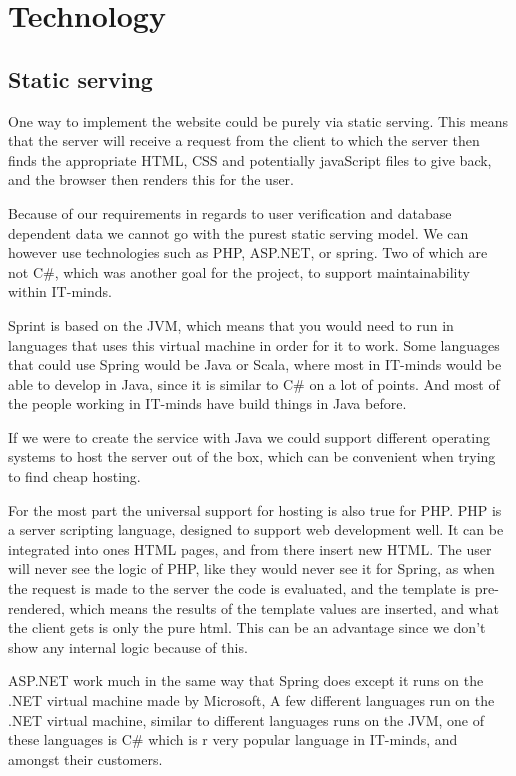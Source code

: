 \chapter{Technology}
\label{chap:Technology}

\section{Static serving}
\label{sec:Static serving}
One way to implement the website could be purely via static serving. This means that the server will receive a request from the client to which the server then finds the appropriate HTML, CSS and potentially javaScript files to give back, and the browser then renders this for the user.

Because of our requirements in regards to user verification and database dependent data we cannot go with the purest static serving model. We can however use technologies such as PHP, ASP.NET, or spring. Two of which are not C\#, which was another goal for the project, to support maintainability within IT-minds.

Sprint is based on the JVM\cite{spring-framework}, which means that you would need to run in languages that uses this virtual machine in order for it to work. Some languages that could use Spring would be Java or Scala, where most in IT-minds would be able to develop in Java, since it is similar to C\# on a lot of points. And most of the people working in IT-minds have build things in Java before.

If we were to create the service with Java we could support different operating systems to host the server out of the box, which can be convenient when trying to find cheap hosting.

For the most part the universal support for hosting is also true for PHP. PHP is a server scripting language\cite{php-home}, designed to support web development well. It can be integrated into ones HTML pages, and from there insert new HTML. The user will never see the logic of PHP, like they would never see it for Spring, as when the request is made to the server the code is evaluated, and the template is pre-rendered, which means the results of the template values are inserted, and what the client gets is only the pure html. This can be an advantage since we don't show any internal logic because of this.

ASP.NET work much in the same way that Spring does except it runs on the .NET virtual machine made by Microsoft, A few different languages run on the .NET virtual machine, similar to different languages runs on the JVM, one of these languages is C\# which is r very popular language in IT-minds, and amongst their customers.


